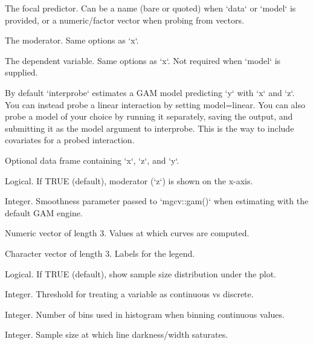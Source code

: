 \documentclass[a4paper]{book}
\begin{document}
%
\begin{Arguments}
\begin{ldescription}
\item[\code{x}] The focal predictor. Can be a name (bare or quoted) when `data` or `model`
is provided, or a numeric/factor vector when probing from vectors.

\item[\code{z}] The moderator. Same options as `x`.

\item[\code{y}] The dependent variable. Same options as `x`. Not required when `model` is supplied.

\item[\code{model}] By default `interprobe` estimates a GAM model predicting `y` with `x` and `z`.
You can instead probe a linear interaction by setting model=linear. You can also probe a 
model of your choice by running it separately, saving the output, and submitting it as the model 
argument to  interprobe. This is the way to include covariates for a probed interaction.

\item[\code{data}] Optional data frame containing `x`, `z`, and `y`.

\item[\code{moderator.on.x.axis}] Logical. If TRUE (default), moderator (`z`) is shown on the x-axis.

\item[\code{k}] Integer. Smoothness parameter passed to `mgcv::gam()` when estimating with the default
GAM engine.

\item[\code{spotlights}] Numeric vector of length 3. Values at which curves are computed.

\item[\code{spotlight.labels}] Character vector of length 3. Labels for the legend.

\item[\code{histogram}] Logical. If TRUE (default), show sample size distribution under the plot.

\item[\code{max.unique}] Integer. Threshold for treating a variable as continuous vs discrete.

\item[\code{n.bin.continuous}] Integer. Number of bins used in histogram when binning continuous values.

\item[\code{n.max}] Integer. Sample size at which line darkness/width saturates.


\end{ldescription}
\end{Arguments}
\end{document}
